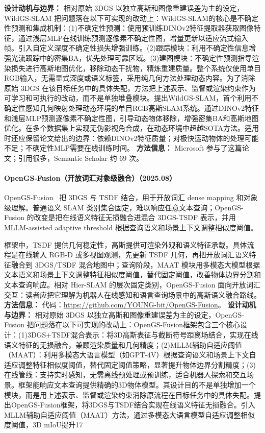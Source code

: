 \textbf{设计动机与边界：} 相对原始 3DGS 以独立高斯和图像重建误差为主的设定，WildGS-SLAM 把问题落在以下可实现的改动上：WildGS-SLAM的核心是不确定性预测和集成机制：(1)不确定性预测：使用预训练DINOv2特征提取器获取图像特征，通过浅层MLP在线训练预测逐像素不确定性图，增量更新以适应流式输入帧。引入自定义深度不确定性损失增强训练。(2)跟踪模块：利用不确定性信息增强光流跟踪中的密集BA，优先处理可靠区域。(3)建图模块：不确定性预测指导渲染损失进行高斯地图优化，移除动态干扰物，精炼重建质量。整个系统仅使用单目RGB输入，无需显式深度或语义标签，采用纯几何方法处理动态内容。为了消除原始 3DGS 在该目标任务中的具体失配，方法把上述表示、监督或渲染约束作为可学习和可执行的改动，而不是单独堆叠模块。提出WildGS-SLAM，首个利用不确定性感知几何映射处理动态环境的单目RGB高斯SLAM系统。通过DINOv2特征和浅层MLP预测逐像素不确定性图，引导动态物体移除，增强密集BA和高斯地图优化。在多个数据集上实现无伪影视角合成，在动态环境中超越SOTA方法。适用时还应保留论文给出的边界：依赖DINOv2特征质量；对极快运动物体的处理可能不足；不确定性MLP需要在线训练时间。
\textbf{方法信息：} Microsoft 参与了这篇论文；引用很多，Semantic Scholar 约 69 次。



\paragraph{OpenGS-Fusion（开放词汇对象级融合）（2025.08）}
OpenGS-Fusion~\cite{2508_01150} 把 3DGS 与 TSDF 结合，用于开放词汇 dense mapping 和对象级理解。普通语义 SLAM 类别集合固定，难以响应任意文本查询；OpenGS-Fusion 的改变是把在线语义特征无损融合进混合 3DGS-TSDF 表示，并用 MLLM-assisted adaptive threshold 根据查询语义和场景上下文调整相似度阈值。

框架中，TSDF 提供几何稳定性，高斯提供可渲染外观和语义特征承载。具体流程是在线输入 RGB-D 或多视图观测，先更新 TSDF 几何，再把开放词汇语义特征融合到 3DGS/TSDF 混合地图中；查询阶段，MAAT 模块用多模态大模型根据文本语义和场景上下文调整特征相似度阈值，替代固定阈值，改善物体边界分割和文本查询响应。相对 Hier-SLAM 的层次固定类别，OpenGS-Fusion 面向开放词汇交互：读者应把它理解为机器人在线感知和语言查询场景中的高斯语义融合路线。
\textbf{方法信息：} 代码：\url{https://github.com/YOUNG-bit/OpenGS-Fusion}。
\textbf{设计动机与边界：} 相对原始 3DGS 以独立高斯和图像重建误差为主的设定，OpenGS-Fusion 把问题落在以下可实现的改动上：OpenGS-Fusion框架包含三个核心设计：(1)3DGS+TSDF混合表示：将3D高斯表征与截断符号距离场结合，实现在线语义特征的无损融合，兼顾渲染质量和几何精度；(2)MLLM辅助自适应阈值（MAAT）：利用多模态大语言模型（如GPT-4V）根据查询语义和场景上下文自适应调整特征相似度阈值，替代固定阈值策略，显著提升物体边界分割精度；(3)在线管线：支持实时感知，无需离线预处理或预训练，适合机器人探索和交互场景。框架能响应文本查询提供精确的3D物体模型。其设计目的不是单独增加一个模块，而是用上述表示、监督或渲染约束消除原流程在目标任务中的具体失配。提出OpenGS-Fusion框架，将3DGS与TSDF结合实现在线语义特征无损融合。引入MLLM辅助自适应阈值（MAAT）方法，通过多模态大语言模型自适应调整相似度阈值，3D mIoU提升17%
